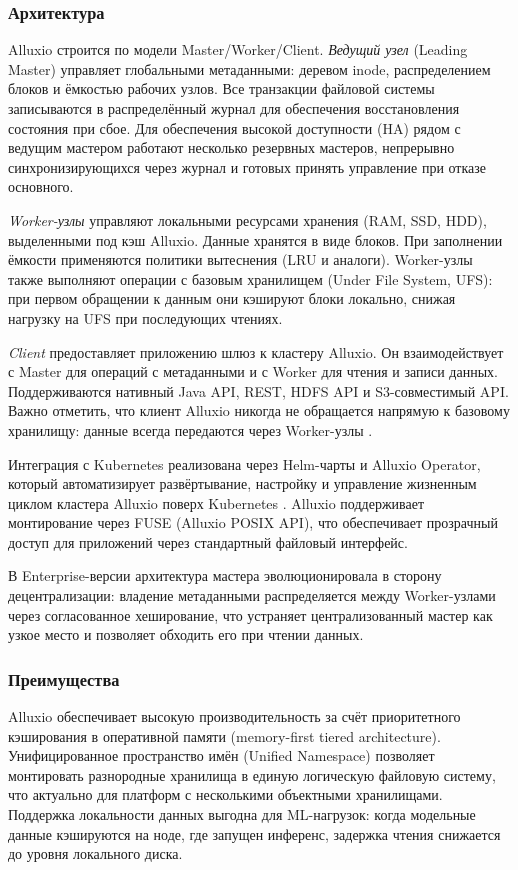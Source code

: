 \subsubsection{Архитектура}

Alluxio строится по модели Master/Worker/Client. \textit{Ведущий узел} (Leading Master) управляет глобальными метаданными: деревом inode, распределением блоков и ёмкостью рабочих узлов. Все транзакции файловой системы записываются в распределённый журнал для обеспечения восстановления состояния при сбое. Для обеспечения высокой доступности (HA) рядом с ведущим мастером работают несколько резервных мастеров, непрерывно синхронизирующихся через журнал и готовых принять управление при отказе основного.

\textit{Worker-узлы} управляют локальными ресурсами хранения (RAM, SSD, HDD), выделенными под кэш Alluxio. Данные хранятся в виде блоков. При заполнении ёмкости применяются политики вытеснения (LRU и аналоги). Worker-узлы также выполняют операции с базовым хранилищем (Under File System, UFS): при первом обращении к данным они кэшируют блоки локально, снижая нагрузку на UFS при последующих чтениях.

\textit{Client} предоставляет приложению шлюз к кластеру Alluxio. Он взаимодействует с Master для операций с метаданными и с Worker для чтения и записи данных. Поддерживаются нативный Java API, REST, HDFS API и S3-совместимый API. Важно отметить, что клиент Alluxio никогда не обращается напрямую к базовому хранилищу: данные всегда передаются через Worker-узлы \cite{alluxio_arch}.

Интеграция с Kubernetes реализована через Helm-чарты и Alluxio Operator, который автоматизирует развёртывание, настройку и управление жизненным циклом кластера Alluxio поверх Kubernetes \cite{alluxio_k8s}. Alluxio поддерживает монтирование через FUSE (Alluxio POSIX API), что обеспечивает прозрачный доступ для приложений через стандартный файловый интерфейс.

В Enterprise-версии архитектура мастера эволюционировала в сторону децентрализации: владение метаданными распределяется между Worker-узлами через согласованное хеширование, что устраняет централизованный мастер как узкое место и позволяет обходить его при чтении данных.

\subsubsection{Преимущества}

Alluxio обеспечивает высокую производительность за счёт приоритетного кэширования в оперативной памяти (memory-first tiered architecture). Унифицированное пространство имён (Unified Namespace) позволяет монтировать разнородные хранилища в единую логическую файловую систему, что актуально для платформ с несколькими объектными хранилищами. Поддержка локальности данных выгодна для ML-нагрузок: когда модельные данные кэшируются на ноде, где запущен инференс, задержка чтения снижается до уровня локального диска.

